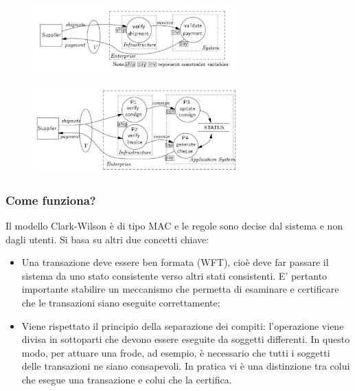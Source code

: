 \begin{figure}[H]
      \centering
      \includegraphics[width=8cm, keepaspectratio]{capitoli/policy/imgs/clark_wilson.png}
\end{figure}
\begin{figure}[H]
      \centering
      \includegraphics[width=8cm, keepaspectratio]{capitoli/policy/imgs/clark_wilson2.png}
\end{figure}

\subsubsection{Come funziona?}

Il modello Clark-Wilson è di tipo MAC e le regole sono decise dal sistema e non 
dagli utenti.
Si basa su altri due concetti chiave:

\begin{itemize}
      \item Una transazione deve essere ben formata (WFT), cioè deve far passare
            il sistema da uno
            stato consistente verso altri stati consistenti. E’ pertanto 
            importante stabilire un
            meccanismo che permetta di esaminare e certificare che le transazioni 
            siano eseguite
            correttamente;
      \item Viene rispettato il principio della separazione dei compiti:
            l’operazione viene divisa in
            sottoparti che devono essere eseguite da soggetti differenti. 
            In questo modo, per attuare
            una frode, ad esempio, è necessario che tutti i soggetti delle 
            transazioni ne siano
            consapevoli. In pratica vi è una distinzione tra colui che esegue 
            una transazione e colui che
            la certifica.
\end{itemize}

